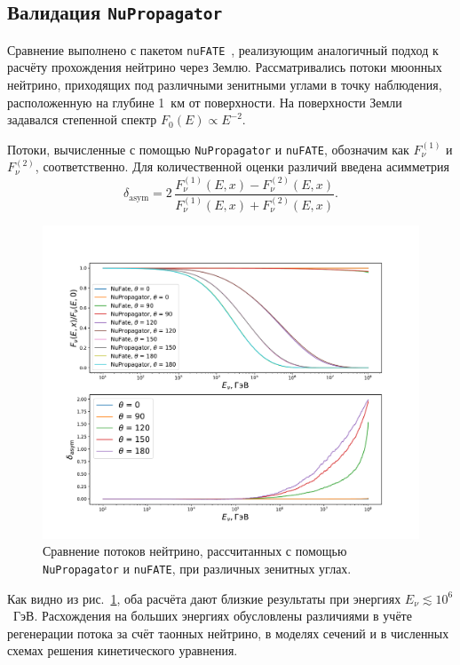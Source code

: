 \subsection{Валидация \texttt{NuPropagator}}

Сравнение выполнено с пакетом \texttt{nuFATE}~\cite{Vincent_2017}, реализующим аналогичный подход к расчёту прохождения нейтрино через Землю. 
Рассматривались потоки мюонных нейтрино, приходящих под различными зенитными углами в точку наблюдения, расположенную на глубине 1~км от поверхности. 
На поверхности Земли задавался степенной спектр $F_0(E) \propto E^{-2}$.  

Потоки, вычисленные с помощью \texttt{NuPropagator} и \texttt{nuFATE}, обозначим как $F_\nu^{(1)}$ и $F_\nu^{(2)}$, соответственно. 
Для количественной оценки различий введена асимметрия
\begin{equation}
\delta_{\text{asym}} = 
2\,\frac{F_\nu^{(1)}(E, x) - F_\nu^{(2)}(E, x)}
       {F_\nu^{(1)}(E, x) + F_\nu^{(2)}(E, x)}.
\end{equation}

\begin{figure}[!h]
\centering
\includegraphics[width=\linewidth]{images/NuProp/compNuandNu.pdf}
\caption{Сравнение потоков нейтрино, рассчитанных с помощью \texttt{NuPropagator} и \texttt{nuFATE}, при различных зенитных углах.}
\label{fig:flux_compare}
\end{figure}

Как видно из рис.~\ref{fig:flux_compare}, оба расчёта дают близкие результаты при энергиях $E_\nu \lesssim 10^6$~ГэВ. 
Расхождения на больших энергиях обусловлены различиями в учёте регенерации потока за счёт таонных нейтрино, в моделях сечений и в численных схемах решения кинетического уравнения.

